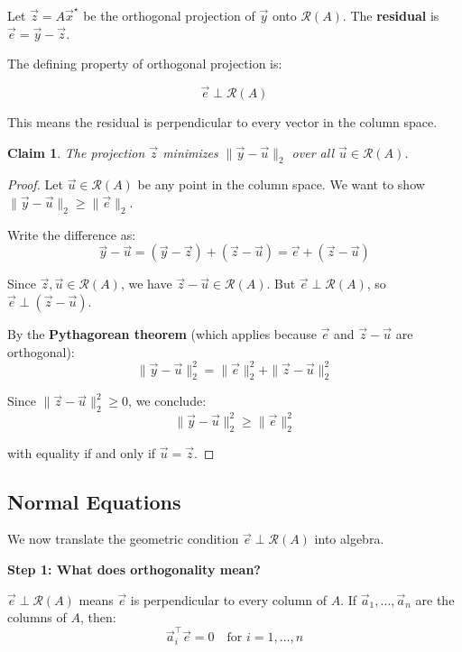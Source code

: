 \documentclass[10pt, twocolumn]{article}
\theoremstyle{definition}
\theoremstyle{plain}
\newtheorem{claim}{Claim}
\newcommand{\Range}{\mathcal{R}}
\begin{document}
Let $\vec{z} = A\vec{x}^\star$ be the orthogonal projection of $\vec{y}$ onto $\Range(A)$. The \textbf{residual} is $\vec{e} = \vec{y} - \vec{z}$.

The defining property of orthogonal projection is:
\begin{result}
\[
    \vec{e} \perp \Range(A)
\]
\end{result}

This means the residual is perpendicular to every vector in the column space.

\begin{claim}
The projection $\vec{z}$ minimizes $\|\vec{y} - \vec{u}\|_2$ over all $\vec{u} \in \Range(A)$.
\end{claim}

\begin{proof}
Let $\vec{u} \in \Range(A)$ be any point in the column space. We want to show $\|\vec{y} - \vec{u}\|_2 \ge \|\vec{e}\|_2$.

Write the difference as:
\[
    \vec{y} - \vec{u} = (\vec{y} - \vec{z}) + (\vec{z} - \vec{u}) = \vec{e} + (\vec{z} - \vec{u})
\]

Since $\vec{z}, \vec{u} \in \Range(A)$, we have $\vec{z} - \vec{u} \in \Range(A)$. But $\vec{e} \perp \Range(A)$, so $\vec{e} \perp (\vec{z} - \vec{u})$.

By the \textbf{Pythagorean theorem} (which applies because $\vec{e}$ and $\vec{z} - \vec{u}$ are orthogonal):
\[
    \|\vec{y} - \vec{u}\|_2^2 = \|\vec{e}\|_2^2 + \|\vec{z} - \vec{u}\|_2^2
\]

Since $\|\vec{z} - \vec{u}\|_2^2 \ge 0$, we conclude:
\[
    \|\vec{y} - \vec{u}\|_2^2 \ge \|\vec{e}\|_2^2
\]

with equality if and only if $\vec{u} = \vec{z}$.
\end{proof}

\subsection{Normal Equations}

We now translate the geometric condition $\vec{e} \perp \Range(A)$ into algebra.

\textbf{Step 1: What does orthogonality mean?}

$\vec{e} \perp \Range(A)$ means $\vec{e}$ is perpendicular to every column of $A$. If $\vec{a}_1, \ldots, \vec{a}_n$ are the columns of $A$, then:
\[
    \vec{a}_i^\top \vec{e} = 0 \quad \text{for } i = 1, \ldots, n
\]
\end{document}

